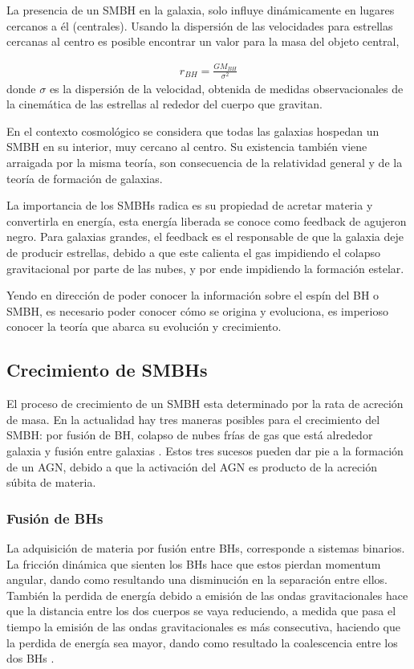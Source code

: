 La presencia de un SMBH en la galaxia, solo influye dinámicamente en lugares cercanos a él (centrales). Usando la dispersión de las velocidades para estrellas cercanas al centro es posible encontrar un valor para la masa del objeto central, 

\begin{align}
    r_{BH}=\frac{GM_{BH}}{\sigma^{2}}
\end{align}
donde $\sigma$ es la dispersión de la velocidad, obtenida de medidas observacionales de la cinemática de las estrellas al rededor del cuerpo que gravitan. 

En el contexto cosmológico se considera que todas las galaxias hospedan un SMBH en su interior, muy cercano al centro. Su existencia también viene arraigada por la misma teoría, son consecuencia de la relatividad general y de la teoría de formación de galaxias. 

La importancia de los SMBHs radica es su propiedad de acretar materia y convertirla en energía, esta energía liberada se conoce como feedback de agujeron negro. Para galaxias grandes, el feedback es el responsable de que la galaxia deje de producir estrellas, debido a que este calienta el gas  impidiendo el colapso gravitacional por parte de las nubes, y por ende impidiendo la formación estelar.

Yendo en dirección de poder conocer la información sobre el espín del BH o SMBH, es necesario poder conocer cómo se origina y evoluciona, es imperioso conocer la teoría que abarca su evolución y crecimiento.
\subsection{Crecimiento de SMBHs}
\label{subsec: Crecimiento_SMBHs}

El proceso de crecimiento de un SMBH esta determinado por la rata de acreción de masa. En la actualidad hay tres maneras posibles para el crecimiento del SMBH: por fusión de BH, colapso de nubes frías de gas que está alrededor galaxia y fusión entre galaxias \cite{fanidakis2011}. Estos tres sucesos pueden dar pie a la formación de un AGN, debido a que la activación del AGN es producto de la acreción súbita de materia. 
    \subsubsection{Fusión de BHs}
    \label{subsubsec: mergers_BHs}
La adquisición de materia por fusión entre BHs, corresponde a sistemas  binarios. La fricción dinámica que sienten los BHs  hace que estos pierdan momentum angular, dando como resultando una disminución en la separación entre ellos. También la perdida de energía debido a emisión de las ondas gravitacionales hace que la distancia entre los dos cuerpos se vaya reduciendo, a medida que pasa el tiempo la emisión de las ondas gravitacionales es más consecutiva, haciendo que la perdida de energía sea mayor, dando como resultado la coalescencia entre los dos BHs \cite{fanidakis2011}. 

